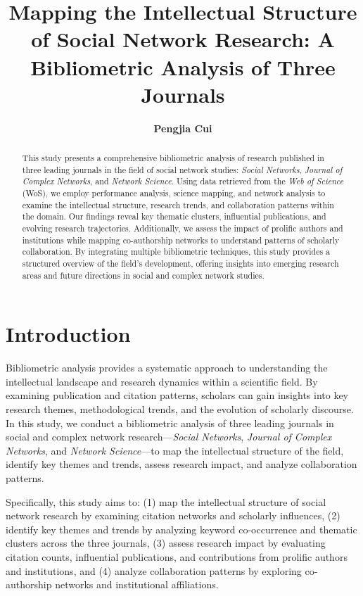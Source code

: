 \documentclass[twocolumn]{article}
\title{\textbf{Mapping the Intellectual Structure of Social Network Research: A Bibliometric Analysis of Three Journals}}
\author{\textbf{Pengjia Cui}}
\date{}
\begin{document}
	
	\maketitle
	
	\begin{abstract}
		This study presents a comprehensive bibliometric analysis of research published in three leading journals in the field of social network studies: \textit{Social Networks}, \textit{Journal of Complex Networks}, and \textit{Network Science}. Using data retrieved from the \textit{Web of Science} (WoS), we employ performance analysis, science mapping, and network analysis to examine the intellectual structure, research trends, and collaboration patterns within the domain. Our findings reveal key thematic clusters, influential publications, and evolving research trajectories. Additionally, we assess the impact of prolific authors and institutions while mapping co-authorship networks to understand patterns of scholarly collaboration. By integrating multiple bibliometric techniques, this study provides a structured overview of the field’s development, offering insights into emerging research areas and future directions in social and complex network studies.
	\end{abstract}
	
	\section{Introduction}\label{Introduction}
	
	Bibliometric analysis provides a systematic approach to understanding the intellectual landscape and research dynamics within a scientific field. By examining publication and citation patterns, scholars can gain insights into key research themes, methodological trends, and the evolution of scholarly discourse. In this study, we conduct a bibliometric analysis of three leading journals in social and complex network research—\textit{Social Networks}, \textit{Journal of Complex Networks}, and \textit{Network Science}—to map the intellectual structure of the field, identify key themes and trends, assess research impact, and analyze collaboration patterns.
	
	Specifically, this study aims to: (1) map the intellectual structure of social network research by examining citation networks and scholarly influences, (2) identify key themes and trends by analyzing keyword co-occurrence and thematic clusters across the three journals, (3) assess research impact by evaluating citation counts, influential publications, and contributions from prolific authors and institutions, and (4) analyze collaboration patterns by exploring co-authorship networks and institutional affiliations.
	
\end{document}
